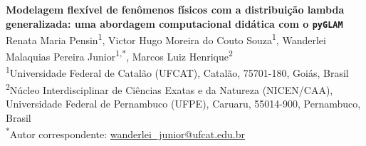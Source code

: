 \begin{center}
{\Large\bfseries Modelagem flexível de fenômenos físicos com a distribuição lambda
generalizada: uma abordagem computacional didática com o \texttt{pyGLAM}}
\\[2ex]

{\small
  Renata Maria Pensin\textsuperscript{1},
  Victor Hugo Moreira do Couto Souza\textsuperscript{1},
  Wanderlei Malaquias Pereira Junior\textsuperscript{1,*},
  Marcos Luiz Henrique\textsuperscript{2}
}
\\[1ex]

{\footnotesize
  \textsuperscript{1}Universidade Federal de Catal\~ao (UFCAT), Catal\~ao,
  75701-180, Goi\'as, Brasil \\[0.3ex]
  \textsuperscript{2}N\'ucleo Interdisciplinar de Ci\^encias Exatas e da
  Natureza (NICEN/CAA), Universidade Federal de Pernambuco (UFPE), Caruaru,
  55014-900, Pernambuco, Brasil
}
\\[0.8ex]

{\footnotesize \textsuperscript{*}Autor correspondente:
\href{mailto:wanderlei_junior@ufcat.edu.br}{wanderlei\_junior@ufcat.edu.br}}
\end{center}
